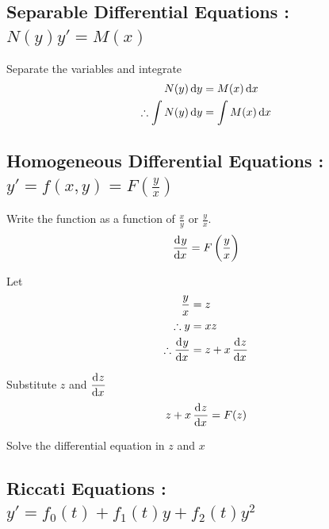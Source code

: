 \documentclass[fleqn, a4paper, 12pt, twoside]{article}
\theoremstyle{definition}
\theoremstyle{theorem}
\begin{document}
\subsection{Separable Differential Equations : $N(y) y' = M(x)$}

\begin{algorithmic}[1]
	\item 
		Separate the variables and integrate
		\begin{align*}
			N(y) \dif y &= M(x) \dif x\\
			\therefore \int N(y) \dif y &= \int M(x) \dif x
		\end{align*}
\end{algorithmic}

\subsection{Homogeneous Differential Equations : $y' = f(x,y) = F \left( \frac{y}{x} \right)$}

\begin{algorithmic}[1]
	\item 
		Write the function as a function of $\frac{x}{y}$ or $\frac{y}{x}$.
		\begin{equation*}
			\dod{y}{x} = F \left( \frac{y}{x} \right)
		\end{equation*}
	\item 
		Let
		\begin{align*}
			\frac{y}{x} &= z\\
			\therefore y &= x z\\
			\therefore \dod{y}{x} &= z + x \dod{z}{x}
		\end{align*}
	\item 
		Substitute $z$ and $\dod{z}{x}$
		\begin{equation*}
			z + x \dod{z}{x} = F(z)
		\end{equation*}
	\item
		Solve the differential equation in $z$ and $x$
\end{algorithmic}

\subsection{Riccati Equations : $y' = f_0(t) + f_1(t) y + f_2(t) y^2$}
\end{document}
